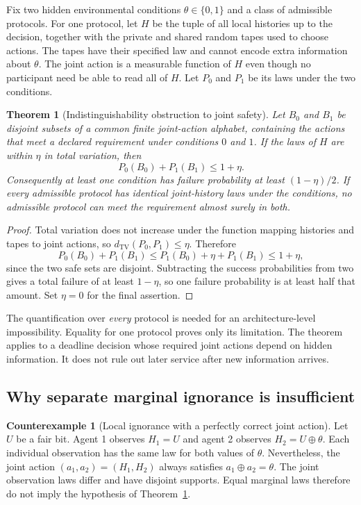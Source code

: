 \documentclass[11pt,letterpaper]{article}
\theoremstyle{plain}
\newtheorem{theorem}[proposition]{Theorem}
\theoremstyle{definition}
\newtheorem{counterexample}[proposition]{Counterexample}
\theoremstyle{remark}
\newcommand{\TV}{d_{\mathrm{TV}}}
\begin{document}
Fix two hidden environmental conditions $\theta\in\{0,1\}$ and a class of admissible protocols. For one protocol, let $H$ be the tuple of all local histories up to the decision, together with the private and shared random tapes used to choose actions. The tapes have their specified law and cannot encode extra information about $\theta$. The joint action is a measurable function of $H$ even though no participant need be able to read all of $H$. Let $P_0$ and $P_1$ be its laws under the two conditions.

\begin{theorem}[Indistinguishability obstruction to joint safety]\label{thm:decsafe}
Let $B_0$ and $B_1$ be disjoint subsets of a common finite joint-action alphabet, containing the actions that meet a declared requirement under conditions $0$ and $1$. If the laws of $H$ are within $\eta$ in total variation, then
\[
P_0(B_0)+P_1(B_1)\leq1+\eta.
\]
Consequently at least one condition has failure probability at least $(1-\eta)/2$. If every admissible protocol has identical joint-history laws under the conditions, no admissible protocol can meet the requirement almost surely in both.
\end{theorem}
\begin{proof}
Total variation does not increase under the function mapping histories and tapes to joint actions, so $\TV(P_0,P_1)\leq\eta$. Therefore
\[
P_0(B_0)+P_1(B_1)
\leq P_1(B_0)+\eta+P_1(B_1)\leq1+\eta,
\]
since the two safe sets are disjoint. Subtracting the success probabilities from two gives a total failure of at least $1-\eta$, so one failure probability is at least half that amount. Set $\eta=0$ for the final assertion.
\end{proof}

The quantification over \emph{every} protocol is needed for an architecture-level impossibility. Equality for one protocol proves only its limitation. The theorem applies to a deadline decision whose required joint actions depend on hidden information. It does not rule out later service after new information arrives.

\subsection{Why separate marginal ignorance is insufficient}
\begin{counterexample}[Local ignorance with a perfectly correct joint action]\label{ex:jointviews}
Let $U$ be a fair bit. Agent 1 observes $H_1=U$ and agent 2 observes $H_2=U\oplus\theta$. Each individual observation has the same law for both values of $\theta$. Nevertheless, the joint action $(a_1,a_2)=(H_1,H_2)$ always satisfies $a_1\oplus a_2=\theta$. The joint observation laws differ and have disjoint supports. Equal marginal laws therefore do not imply the hypothesis of Theorem~\ref{thm:decsafe}.
\end{counterexample}
\end{document}
